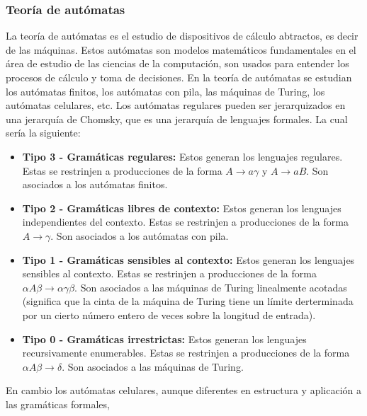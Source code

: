 \subsubsection{Teor\'ia de aut\'omatas}
    \label{sec:TeoriaAutomatas}
    La teor\'ia de aut\'omatas es el estudio de dispositivos de c\'alculo abtractos, es decir de las m\'aquinas.\cite{Hopcroft1979}
        Estos aut\'omatas son modelos matem\'aticos fundamentales en el \'area de estudio de las ciencias de la computaci\'on, 
        son usados para entender los procesos de c\'alculo y toma de decisiones. En la teor\'ia de aut\'omatas se estudian
        los aut\'omatas finitos, los aut\'omatas con pila, las m\'aquinas de Turing, los aut\'omatas celulares, etc.
        Los aut\'omatas regulares pueden ser jerarquizados en una jerarqu\'ia de Chomsky, que es una jerarqu\'ia de lenguajes formales.
        La cual ser\'ia la siguiente\cite{Aranda2006}:
        \begin{itemize}
            \item \textbf{Tipo 3 - Gram\'aticas regulares:} Estos generan los lenguajes regulares.
                Estas se restrinjen a producciones de la forma $A \rightarrow a\gamma$ y $A \rightarrow aB$. Son 
                asociados a los aut\'omatas finitos.
            \item \textbf{Tipo 2 - Gram\'aticas libres de contexto:} Estos generan los lenguajes independientes del contexto.
                Estas se restrinjen a producciones de la forma $A \rightarrow \gamma$. Son asociados a los aut\'omatas con pila.
            \item \textbf{Tipo 1 - Gram\'aticas sensibles al contexto:} Estos generan los lenguajes sensibles al contexto.
                Estas se restrinjen a producciones de la forma ${\alpha}A{\beta} \rightarrow {\alpha}{\gamma}{\beta}$. 
                Son asociados a las m\'aquinas de Turing linealmente acotadas (significa que la cinta de la m\'aquina de Turing
                tiene un l\'imite derterminada por un cierto n\'umero entero de veces sobre la longitud de entrada).
            \item \textbf{Tipo 0 - Gram\'aticas irrestrictas:} Estos generan los lenguajes recursivamente enumerables.
                Estas se restrinjen a producciones de la forma ${\alpha}A{\beta} \rightarrow {\delta}$. Son asociados a las m\'aquinas de Turing.
        \end{itemize}
    \vskip 0.5cm
    En cambio los aut\'omatas celulares, aunque diferentes en estructura y aplicaci\'on a las gram\'aticas formales, 
